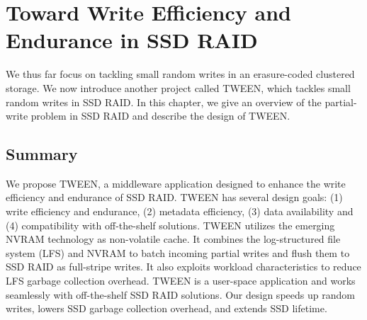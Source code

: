 \chapter{Toward Write Efficiency and Endurance in SSD RAID}
\label{chap:tween}

We thus far focus on tackling small random writes in an erasure-coded clustered
storage. We now introduce another project called TWEEN, which tackles small
random writes in SSD RAID. In this chapter, we give an
overview of the partial-write problem in SSD RAID and describe the design of
TWEEN.




\section{Summary}

We propose TWEEN, a middleware application designed to enhance the write
efficiency and endurance of SSD RAID. TWEEN has several design goals: (1)
write efficiency and endurance, (2) metadata efficiency, (3) data availability
and (4) compatibility with off-the-shelf solutions. TWEEN utilizes the
emerging NVRAM technology as non-volatile cache.  It combines the
log-structured file system (LFS) and NVRAM to batch incoming partial writes
and flush them to SSD RAID as full-stripe writes.  It also exploits workload
characteristics to reduce LFS garbage collection overhead.  TWEEN is a
user-space application and works seamlessly with off-the-shelf SSD RAID
solutions. Our design speeds up random writes, lowers SSD garbage collection 
overhead, and extends SSD lifetime.
